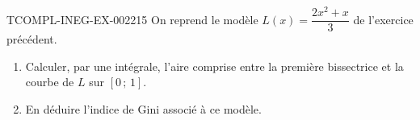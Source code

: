\begin{exercice}{TCOMPL-INEG-EX-002}{2}{15}
On reprend le modèle $L(x) = \dfrac{2x^2+x}{3}$ de l'exercice précédent.
\begin{enumerate}
  \item Calculer, par une intégrale, l'aire comprise entre la première
        bissectrice et la courbe de $L$ sur $[0\,;\,1]$.
  \item En déduire l'indice de Gini associé à ce modèle.
\end{enumerate}
\end{exercice}
